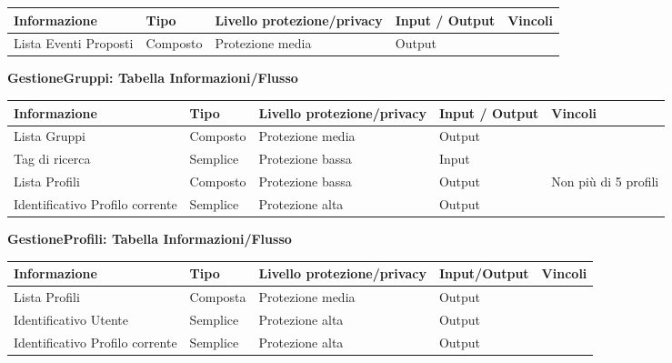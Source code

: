 \begin{tabular} {|P{3cm}|P{2.5cm}|P{3cm}|P{3cm}|P{3cm}|}
    \hline
    \textbf{Informazione} & \textbf{Tipo} & \textbf{Livello protezione/privacy} & \textbf{Input / Output} & \textbf{Vincoli} \\
    \hline
    Lista Eventi Proposti & Composto      & Protezione media                    & Output                  &                  \\
    \hline
\end{tabular}
\hfill \break

\textbf{GestioneGruppi: Tabella Informazioni/Flusso}
\hfill \break

\begin{tabular} {|P{3cm}|P{2.5cm}|P{3cm}|P{3cm}|P{3cm}|}
    \hline
    \textbf{Informazione}           & \textbf{Tipo} & \textbf{Livello protezione/privacy} & \textbf{Input / Output} & \textbf{Vincoli}     \\
    \hline
    Lista Gruppi                    & Composto      & Protezione media                    & Output                  &                      \\
    \hline
    Tag di ricerca                  & Semplice      & Protezione bassa                    & Input                   &                      \\
    \hline
    Lista Profili                   & Composto      & Protezione bassa                    & Output                  & Non più di 5 profili \\
    \hline
    Identificativo Profilo corrente & Semplice      & Protezione alta                     & Output                  &                      \\
    \hline
\end{tabular}
\hfill \break

\textbf{GestioneProfili: Tabella Informazioni/Flusso}
\hfill \break

\begin{tabular} {|P{3cm}|P{2.5cm}|P{3cm}|P{3cm}|P{3cm}|}
    \hline
    \textbf{Informazione}           & \textbf{Tipo} & \textbf{Livello protezione/privacy} & \textbf{Input/Output} & \textbf{Vincoli} \\
    \hline
    Lista Profili                   & Composta      & Protezione media                    & Output                &                  \\
    \hline
    Identificativo Utente           & Semplice      & Protezione alta                     & Output                &                  \\
    \hline
    Identificativo Profilo corrente & Semplice      & Protezione alta                     & Output                &                  \\
    \hline
\end{tabular}
\hfill \break

